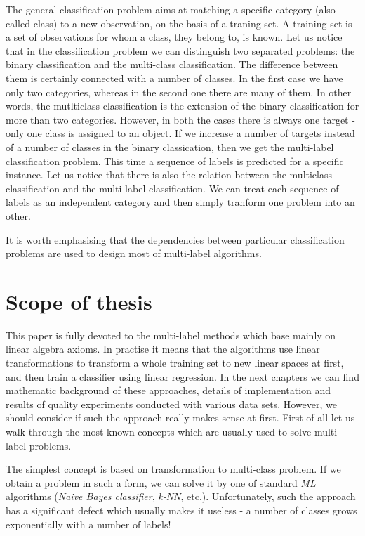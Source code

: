 The general classification problem aims at matching a specific category (also called class) to a new observation, on the basis of a traning set. A training set is a set of observations for whom a class, they belong to, is known. Let us notice that in the classification problem we can distinguish two separated problems: the binary classification and the multi-class classification. The difference between them is certainly connected with a number of classes. In the first case we have only two categories, whereas in the second one there are many of them. In other words, the mutlticlass classification is the extension of the binary classification for more than two categories. However, in both the cases there is always one target - only one class is assigned to an object. If we increase a number of targets instead of a number of classes in the binary classication, then we get the multi-label classification problem. This time a sequence of labels is predicted for a specific instance. Let us notice that there is also the relation between the multiclass classification and the multi-label classification. We can treat each sequence of labels as an independent category and then simply tranform one problem into an other. 

It is worth emphasising that the dependencies between particular classification problems are used to design most of multi-label algorithms. 

\section{Scope of thesis}

This paper is fully devoted to the multi-label methods which base mainly on linear algebra axioms. In practise it means that the algorithms use linear transformations to transform a whole training set to new linear spaces at first, and then train a classifier using linear regression. In the next chapters we can find mathematic background of these approaches, details of implementation and results of quality experiments conducted with various data sets. However, we should consider if such the approach really makes sense at first. First of all let us walk through the most known concepts which are usually used to solve multi-label problems.

The simplest concept is based on transformation to multi-class problem. If we obtain a problem in such a form, we can solve it by one of standard \textit{ML} algorithms (\textit{Naive Bayes classifier}, \textit{k-NN}, etc.). Unfortunately, such the approach has a significant defect which usually makes it useless - a number of classes grows exponentially with a number of labels!

